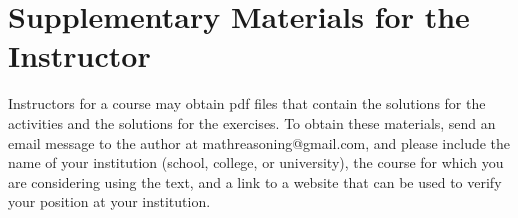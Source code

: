 %


\section*{Supplementary Materials for the Instructor}
Instructors for a course may obtain pdf files that contain the solutions for the \typel activities and the solutions for the exercises.
To obtain these materials, send an email message to the author at mathreasoning@gmail.com, and please include the name of your institution (school, college, or university), the course for which you are considering using the text, and a link to a website that can be used to verify your position at your institution.

